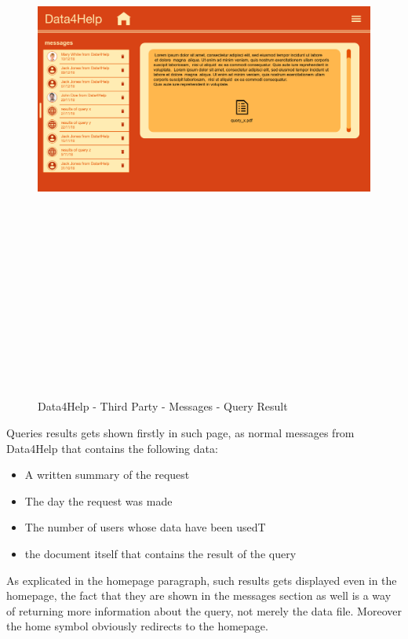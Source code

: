 \begin{figure}[H]
    \includegraphics[width=.6\linewidth, height = 20cm, keepaspectratio]{./Images/Mockups/Data4Help/D4HTP/D4HTP_ShowQuery.png}
    \centering
    \caption{Data4Help - Third Party - Messages - Query Result}
    \label{fig:sab}
  \end{figure}
Queries results gets shown firstly in such page, as normal messages from Data4Help that contains the following data:
\begin{itemize}
\item A written summary of the request
\item The day the request was made
\item The number of users whose data have been usedT
\item the document itself that contains the result of the query
\end{itemize}
As explicated in the homepage paragraph, such results gets displayed even in the homepage, the fact that they are shown in the messages section as well is a way of returning more information about the query, not merely the data file.
Moreover the home symbol obviously redirects to the homepage.




